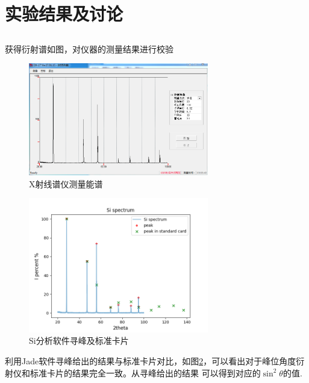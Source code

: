 \documentclass[10pt]{ctexart}
\begin{document}
\section{实验结果及讨论}
\subsection{}
获得衍射谱如图，对仪器的测量结果进行校验
\begin{figure}[htbp]
    \centering
    \includegraphics[width=0.7\textwidth]{data/Si/si.png}
    \caption{X射线谱仪测量能谱}
    \label{fig:SiXspec}
\end{figure}
\begin{figure}[htbp]
    \centering
    \includegraphics[width=0.7\textwidth]{data/Si/spectrum.png}
    \caption{Si分析软件寻峰及标准卡片}
    \label{fig:SiJadespec}
\end{figure}
利用Jade软件寻峰给出的结果与标准卡片对比，如图\ref{fig:SiJadespec}，可以看出对于峰位角度衍射仪和标准卡片的结果完全一致。从寻峰给出的结果
可以得到对应的$\sin^2{\theta}$的值.
\end{document}
